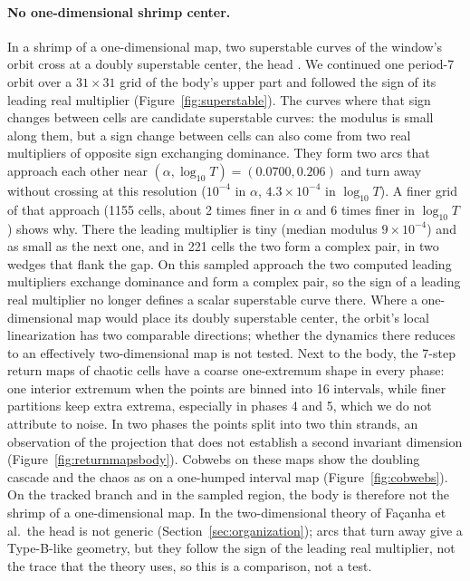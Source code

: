 \documentclass[11pt,letterpaper]{article}
\begin{document}
\paragraph{No one-dimensional shrimp center.} In a shrimp of a one-dimensional map, two superstable curves of the
window's orbit cross at a doubly superstable center, the head \cite{gallas1994dissecting,facanha2013endoskeletons}. We continued
one period-7 orbit over a $31\times31$ grid of the body's upper part and followed the sign of its leading real
multiplier (Figure~\ref{fig:superstable}). The curves where that sign changes between cells are candidate superstable
curves: the modulus is small along them, but a sign change between cells can also come from two real multipliers of
opposite sign exchanging dominance. They form two arcs that approach each other near
$(\alpha,\log_{10}T)=(0.0700,0.206)$ and turn away without crossing at this resolution ($10^{-4}$ in $\alpha$,
$4.3\times10^{-4}$ in $\log_{10}T$). A finer grid of that approach (1155 cells, about 2 times finer in $\alpha$ and 6
times finer in $\log_{10}T$) shows why. There the leading multiplier is tiny (median modulus $9\times10^{-4}$) and as small as the next
one, and in 221 cells the two form a complex pair, in two wedges that flank the gap. On this sampled approach the two
computed leading multipliers exchange dominance and form a complex pair, so the sign of a leading real multiplier no
longer defines a scalar superstable curve there. Where a one-dimensional map would place its doubly superstable center,
the orbit's local linearization has two comparable directions; whether the dynamics there reduces to an effectively
two-dimensional map is not tested. Next to the body, the 7-step return maps of chaotic cells have a coarse
one-extremum shape in every phase: one interior extremum when the points are binned into 16 intervals, while finer
partitions keep extra extrema, especially in phases 4 and 5, which we do not attribute to noise. In two phases the
points split into two thin strands, an observation of the projection that does not establish a second invariant
dimension (Figure~\ref{fig:returnmapsbody}). Cobwebs on these maps show the doubling cascade and the chaos as on a
one-humped interval map (Figure~\ref{fig:cobwebs}). On the tracked branch and in the sampled region, the body is
therefore not the shrimp of a one-dimensional map. In the two-dimensional theory of Fa\c{c}anha et al.\ the head is
not generic (Section~\ref{sec:organization}); arcs that turn away give a Type-B-like geometry, but they follow the
sign of the leading real multiplier, not the trace that the theory uses, so this is a comparison, not a test.
\end{document}
